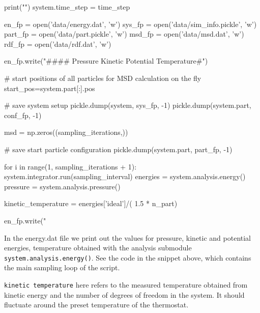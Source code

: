 \documentclass[
paper=a4,                       %
fontsize=11pt,                  %
twoside,                        %
footsepline,                    %
headsepline,                    %
headinclude=false,              %
footinclude=false,              %
pagesize,                       %
]{scrartcl}
\newtheorem{task}{Task}
\begin{document}
{\begin{pypresso}
print("\nSampling\n")
system.time_step = time_step

en_fp   = open('data/energy.dat', 'w')
sys_fp  = open('data/sim_info.pickle', 'w')
part_fp = open('data/part.pickle', 'w')
msd_fp  = open('data/msd.dat', 'w')
rdf_fp  = open('data/rdf.dat', 'w')

en_fp.write("#\n#\n#\n# Pressure   Kinetic Potential   Temperature\n#\n")

# start positions of all particles for MSD calculation on the fly
start_pos=system.part[:].pos

# save system setup
pickle.dump(system, sys_fp, -1)
pickle.dump(system.part, conf_fp, -1)

msd = np.zeros((sampling_iterations,))

# save start particle configuration
pickle.dump(system.part, part_fp, -1)

for i in range(1, sampling_iterations + 1):
    system.integrator.run(sampling_interval)
    energies = system.analysis.energy()
    pressure = system.analysis.pressure()

    kinetic_temperature = energies['ideal']/( 1.5 * n_part)

    en_fp.write("%
\end{pypresso}}\vspace{0,2cm}

In the energy.dat file we print out the values for pressure, kinetic
and potential energies, temperature obtained with the analysis submodule
\lstinline|system.analysis.energy()|. See the code in the snippet above, which
contains the main sampling loop of the script.

\noindent \texttt{kinetic temperature} here refers to the measured temperature
obtained from kinetic energy and the number of degrees of freedom in the system. It
should fluctuate around the preset temperature of the thermostat.

\newpage
\vspace{1cm}\vspace{1cm}
\end{document}
